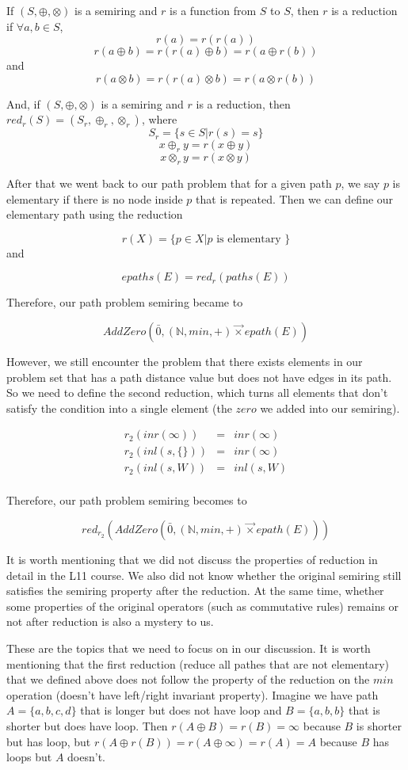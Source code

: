 \documentclass[a4paper,12pt,twoside,openright]{report}
\newcommand{\e}[2]{
\begin{equation}
  \label{#1} 
  #2
\end{equation}
}
\begin{document}
If $(S,\oplus,\otimes)$ is a semiring and $r$ is a function from $S$ to $S$, then $r$ is a reduction if $\forall a,b \in S$, 
\[r(a) = r(r(a))\]
\[r(a\oplus b) = r(r(a)\oplus b) = r(a\oplus r(b))\] and 
\[r(a\otimes b) = r(r(a)\otimes b) = r(a\otimes r(b))\]

And, if $(S,\oplus,\otimes)$ is a semiring and $r$ is a reduction, then $red_r(S) = (S_r,\oplus_r,\otimes_r)$, where 
\[S_r = \{s\in S|r(s)= s\}\]
\[x\oplus_r y = r(x\oplus y)\]
\[x\otimes_r y = r(x\otimes y)\]

After that we went back to our path problem that for a given path $p$, we say $p$ is elementary if there is no node inside $p$ that is repeated. Then we can define our elementary path using the reduction 
\e{r:def:elementary}{r(X) = \{p\in X | p \mbox{ is elementary }\}}and 
\e{r:def:elementary_path}{epaths(E) = red_r(paths(E))}

Therefore, our path problem semiring became to 
\e{r:def:path_problem}{AddZero(\bar0,(\mathbb{N},min,+) \overrightarrow{\times} epath(E))}

However, we still encounter the problem that there exists elements in our problem set that has a path distance value but does not have edges in its path. So we need to define the second reduction, which turns all elements that don't satisfy the condition into a single element (the $zero$ we added into our semiring).
\e{r:def:reduction_annihilator}{
\begin{array}{rcl} 
r_2 (inr(\infty)) & = & inr(\infty) \\
r_2 (inl(s,\{\})) & = & inr(\infty) \\
r_2 (inl(s,W))    & = & inl(s,W) \\
\end{array}}
Therefore, our path problem semiring becomes to 
\e{r:def:reduced_path_problem}{red_{r_2}(AddZero(\bar0,(\mathbb{N},min,+) \overrightarrow{\times} epath(E)))}

It is worth mentioning that we did not discuss the properties of reduction in detail in the L11 course. We also did not know whether the original semiring still satisfies the semiring property after the reduction. At the same time, whether some properties of the original operators (such as commutative rules) remains or not after reduction is also a mystery to us.

These are the topics that we need to focus on in our discussion.
It is worth mentioning that the first reduction (reduce all pathes that are not elementary) that we defined above does not follow the property of the reduction on the $min$ operation (doesn't have left/right invariant property). Imagine we have path $A = \{a,b,c,d\}$ that is longer but does not have loop and $B = \{a,b,b\}$ that is shorter but does have loop. Then $r(A\oplus B) = r(B) = \infty$ because $B$ is shorter but has loop, but $r(A\oplus r(B)) = r(A \oplus \infty) = r(A) = A$ because $B$ has loops but $A$ doesn't.
\end{document}
